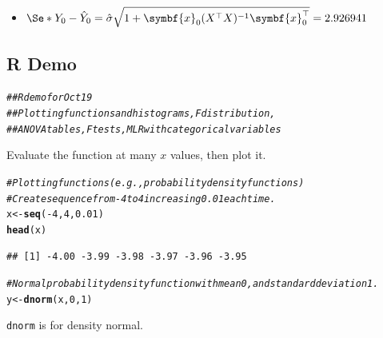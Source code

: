 \documentclass[oneside]{book}\usepackage[]{graphicx}\usepackage[dvipsnames,table,xcdraw]{xcolor}
\makeatletter
\newcommand{\hlnum}[1]{\textcolor[rgb]{0.686,0.059,0.569}{#1}}%
\newcommand{\hlcom}[1]{\textcolor[rgb]{0.678,0.584,0.686}{\textit{#1}}}%
\newcommand{\hlopt}[1]{\textcolor[rgb]{0,0,0}{#1}}%
\newcommand{\hlstd}[1]{\textcolor[rgb]{0.345,0.345,0.345}{#1}}%
\newcommand{\hlkwb}[1]{\textcolor[rgb]{0.69,0.353,0.396}{#1}}%
\newcommand{\hlkwd}[1]{\textcolor[rgb]{0.737,0.353,0.396}{\textbf{#1}}}%
\newenvironment{kframe}{%
 \def\at@end@of@kframe{}%
 \ifinner\ifhmode%
  \def\at@end@of@kframe{\end{minipage}}%
  \begin{minipage}{\columnwidth}%
 \fi\fi%
 \def\FrameCommand##1{\hskip\@totalleftmargin \hskip-\fboxsep
 \colorbox{shadecolor}{##1}\hskip-\fboxsep
     \hskip-\linewidth \hskip-\@totalleftmargin \hskip\columnwidth}%
 \MakeFramed {\advance\hsize-\width
   \@totalleftmargin\z@ \linewidth\hsize
   \@setminipage}}%
 {\par\unskip\endMakeFramed%
 \at@end@of@kframe}
\newenvironment{knitrout}{}{} %
\newcommand{\code}[1]{\texttt{#1}}
\makeatother
\begin{document}
\begin{itemize}
  \item $\Se*{Y_0-\hat{Y}_0}=\hat{\sigma}\sqrt{1+\symbf{x}_0(X^\top X)^{-1}\symbf{x}_0^\top}=2.926941$
\end{itemize}





\subsection{R Demo}
\begin{knitrout}
\color{fgcolor}\begin{kframe}
\begin{alltt}
\hlcom{## R demo for Oct 19}
\hlcom{## Plotting functions and histograms, F distribution,}
\hlcom{## ANOVA tables, F tests, MLR with categorical variables}
\end{alltt}
\end{kframe}
\end{knitrout}
Evaluate the function at many $x$ values, then plot it.
\begin{knitrout}
\color{fgcolor}\begin{kframe}
\begin{alltt}
\hlcom{# Plotting functions (e.g., probability density functions)}
\hlcom{# Create sequence from -4 to 4 increasing 0.01 each time.}
\hlstd{x} \hlkwb{<-} \hlkwd{seq}\hlstd{(}\hlopt{-}\hlnum{4}\hlstd{,} \hlnum{4}\hlstd{,} \hlnum{0.01}\hlstd{)}
\hlkwd{head}\hlstd{(x)}
\end{alltt}
\begin{verbatim}
## [1] -4.00 -3.99 -3.98 -3.97 -3.96 -3.95
\end{verbatim}
\begin{alltt}
\hlcom{# Normal probability density function with mean 0, and standard deviation 1.}
\hlstd{y} \hlkwb{<-} \hlkwd{dnorm}\hlstd{(x,} \hlnum{0}\hlstd{,} \hlnum{1}\hlstd{)}
\end{alltt}
\end{kframe}
\end{knitrout}

\code{dnorm} is for density normal.
\end{document}
